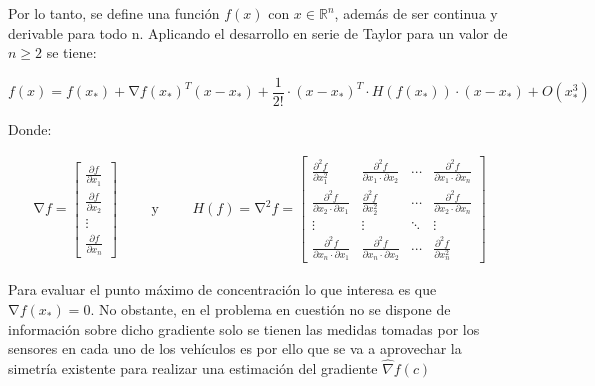 Por lo tanto, se define una función $f\left(x\right)$ con $x\in\mathbb{R}^{n}$, además de ser continua y derivable para todo n. Aplicando el desarrollo en serie de Taylor para un valor de $n\geq{2}$ se tiene:

\begin{equation}\label{TaylorNormal}
	f\left(x\right)=f\left(x_{*}\right)+\mathrm{\nabla}{f}{\left(x_{*}\right)}^{T}\left(x-x_{*}\right)+\frac{1}{2!}\cdot{\left(x-x_{*}\right)}^{T}\cdot{H}\left({f}\left(x_{*}\right)\right) 		\cdot\left(x-x_{*}\right)+O\left(x_{*}^3\right)
\end{equation}

Donde:

\begin{equation*}
	\begin{aligned}
		\mathrm{\nabla}{f}=
	\begin{bmatrix}
		\frac{\partial{f}}{\partial{x}_1} \\
		\frac{\partial{f}}{\partial{x}_2}  \\
		\vdots \\
		\frac{\partial{f}}{\partial{x}_n}
	\end{bmatrix}
	\end{aligned}
	\qquad\text{y}\qquad
	\begin{aligned}
	{H}\left(f\right)=\mathrm{\nabla}^{2}{f}= 	
	\begin{bmatrix}
		\frac{\partial^{2}{f}}{\partial{x}_{1}^{2}} & \frac{\partial^{2}{f}}{\partial{x}_{1}\cdot\partial{x}_{2}} & \cdots & \frac{\partial^{2}{f}}{\partial{x}_{1}\cdot\partial{x}_{n}}\\
		\frac{\partial^{2}{f}}{\partial{x}_{2}\cdot\partial{x}_{1}} & \frac{\partial^{2}{f}}{\partial{x}_{2}^{2}} & \cdots & \frac{\partial^{2}{f}}{\partial{x}_{2}\cdot\partial{x}_{n}}\\
		\vdots & \vdots & \ddots & \vdots\\
		\frac{\partial^{2}{f}}{\partial{x}_{n}\cdot\partial{x}_{1}} & \frac{\partial^{2}{f}}{\partial{x}_{n}\cdot\partial{x}_{2}} & \cdots & \frac{\partial^{2}{f}}{\partial{x}_{n}^{2}}
	\end{bmatrix}
	\end{aligned}
\end{equation*}

Para evaluar el punto máximo de concentración lo que interesa es que $\mathrm{\nabla}{f}{\left(x_{*}\right)}=0$. No obstante, en el problema en cuestión no se dispone de información sobre dicho gradiente solo se tienen las medidas tomadas por los sensores en cada uno de los vehículos es por ello que se va a aprovechar la simetría existente para realizar una estimación del gradiente $\hat{\nabla}{f}\left(c\right)$


